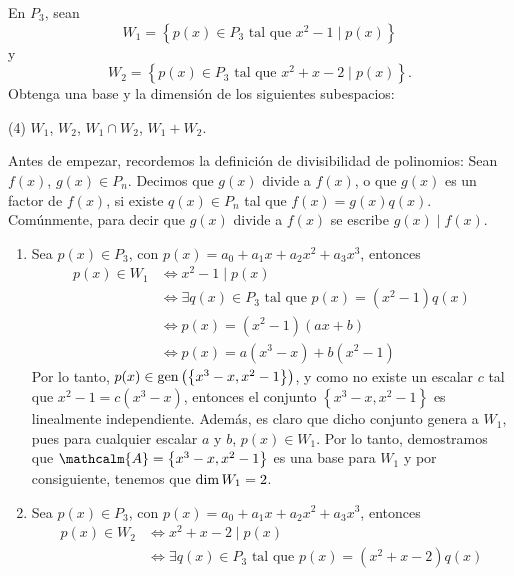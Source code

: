\begin{examplebox}{}{}
    En $P_3$, sean
    $$W_1 = \left\{ p(x) \in P_3 \text{ tal que } x^2 - 1 \mid p(x) \right\}$$
    y
    $$W_2 = \left\{ p(x) \in P_3 \text{ tal que } x^2 + x - 2 \mid p(x) \right\}.$$
    Obtenga una base y la dimensión de los siguientes subespacios:
    \begin{tasks}(4)
        \task $W_1$,
        \task $W_2$,
        \task $W_1 \cap W_2$,
        \task $W_1 + W_2$.
    \end{tasks}

    \tcblower
    \demostracion Antes de empezar, recordemos la definición de divisibilidad de polinomios: Sean $f(x)$, $g(x) \in P_n$. Decimos que $g(x)$ divide a $f(x)$, o que $g(x)$ es un factor de $f(x)$, si existe $q(x) \in P_n$ tal que $f(x) = g(x)q(x)$. Comúnmente, para decir que $g(x)$ divide a $f(x)$ se escribe $g(x) \mid f(x)$.
    \begin{enumerate}[label=\alph*), topsep=6pt, itemsep=0pt]
        \item Sea $p(x) \in P_3$, con $p(x) = a_0 + a_1x + a_2x^2 + a_3x^3$, entonces
        \begin{align*}
            p(x) \in W_1 & \Longleftrightarrow x^2 - 1 \mid p(x) \\
            & \Longleftrightarrow \exists q(x) \in P_3 \text{ tal que } p(x) = \left( x^2 - 1 \right) q(x) \\
            & \Longleftrightarrow p(x) = \left( x^2 - 1 \right) (ax + b) \\
            & \Longleftrightarrow p(x) = a\left( x^3 - x \right) + b\left( x^2 - 1 \right)
        \end{align*}
        Por lo tanto, $p(x) \in \operatorname{gen} \left(\left\{ x^3 - x, x^2 - 1 \right\}\right)$, y como no existe un escalar $c$ tal que $x^2 - 1 = c \left( x^3 - x \right)$, entonces el conjunto $\left\{ x^3 - x, x^2 - 1 \right\}$ es linealmente independiente. Además, es claro que dicho conjunto genera a $W_1$, pues para cualquier escalar $a$ y $b$, $p(x) \in W_1$. Por lo tanto, demostramos que $\mathcalm{A} = \left\{ x^3 - x, x^2 - 1 \right\}$ es una base para $W_1$ y por consiguiente, tenemos que $\operatorname{dim} W_1 = 2$.
        \item Sea $p(x) \in P_3$, con $p(x) = a_0 + a_1x + a_2x^2 + a_3x^3$, entonces
        \begin{align*}
            p(x) \in W_2 & \Longleftrightarrow x^2 + x - 2 \mid p(x) \\
            & \Longleftrightarrow \exists q(x) \in P_3 \text{ tal que } p(x) = \left( x^2 + x - 2 \right) q(x) \\

\end{align*}
\end{enumerate}
\end{examplebox}
